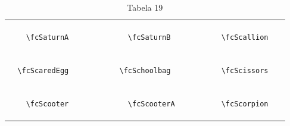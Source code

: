 \documentclass[x11names]{article}
\begin{document}
\begin{table}[H]
\begin{tabular}{|c|c|c|c|c|c|}
		&\multirow{5}{*}{	\fcSaturnA	[scale=0.16]} & &\multirow{5}{*}{	\fcSaturnB	[scale=0.16]} & &\multirow{5}{*}{	\fcScallion	[scale=0.16]}\\	& & & & & \\	& & & & & \\	\verb|	\fcSaturnA	| & & \verb|	\fcSaturnB	| & & \verb|	\fcScallion	| & \\	& & & & & \\	& & & & & \\	& & & & & \\	\hline									
		&\multirow{5}{*}{	\fcScaredEgg	[scale=0.16]} & &\multirow{5}{*}{	\fcSchoolbag	[scale=0.16]} & &\multirow{5}{*}{	\fcScissors	[scale=0.16]}\\	& & & & & \\	& & & & & \\	\verb|	\fcScaredEgg	| & & \verb|	\fcSchoolbag	| & & \verb|	\fcScissors	| & \\	& & & & & \\	& & & & & \\	& & & & & \\	\hline									
		&\multirow{5}{*}{	\fcScooter	[scale=0.16]} & &\multirow{5}{*}{	\fcScooterA	[scale=0.16]} & &\multirow{5}{*}{	\fcScorpion	[scale=0.16]}\\	& & & & & \\	& & & & & \\	\verb|	\fcScooter	| & & \verb|	\fcScooterA	| & & \verb|	\fcScorpion	| & \\	& & & & & \\	& & & & & \\	& & & & & \\		\hline 	\hline 	\end{tabular}	\caption{	Tabela 19	}\label{	Tab19	}\end{table}
\end{document}

